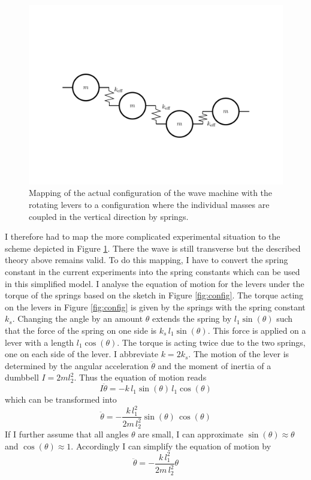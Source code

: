 \documentclass[12pt]{article}
\begin{document}
\begin{figure}[hbt]
  \includegraphics[width =.5\textwidth]{results/equivalance.pdf}
  \caption{Mapping of the actual configuration of the wave machine with the rotating levers to a configuration where the individual masses are coupled in the vertical direction by springs.}\label{fig:equivalence}
\end{figure}
I therefore had to map the more complicated experimental situation to the  scheme depicted in Figure \ref{fig:equivalence}. There the wave is still transverse but the described theory above remains valid. To do this mapping, I have to convert the spring constant in the current experiments into the spring constants which can be used in this simplified model. I analyse the equation of motion for the levers under the torque of the springs based on the sketch in Figure \ref{fig:config}. The torque acting on the levers in Figure \ref{fig:config} is given by the springs with the spring constant $k_s$. Changing the angle by an amount $\theta$ extends the spring by $l_{1}\sin(\theta)$ such that the force of the spring on one side is $k_s\, l_{1}\sin(\theta)$. This force is applied on a lever with a length $l_{1}\cos(\theta)$. The torque is acting twice due to the two springs, one on each side of the lever. I abbreviate $k=2k_{s}$. The motion of the lever is determined by the angular acceleration $\ddot{\theta}$ and the moment of inertia of a dumbbell $I=2 m l_{2}^2$. Thus the equation of motion reads
\begin{equation}\label{eq:eqofmotion}
    I\ddot{\theta}=-k\, l_{1}\sin(\theta)\, l_{1}\cos(\theta)
\end{equation}
which can be transformed into 
\begin{equation}
    \ddot{\theta}=-\frac{k\, l_{1}^2}{2m\,l_{2}^2}\sin(\theta)\,\cos(\theta)
\end{equation}
If I further assume that all angles $\theta$ are small, I can approximate $\sin(\theta)\approx \theta$ and $\cos(\theta)\approx 1$. Accordingly I can simplify the equation of motion by
\begin{equation}
    \ddot{\theta}=-\frac{k\, l_{1}^2}{2m\,l_{2}^2}\theta
\end{equation}
\end{document}

